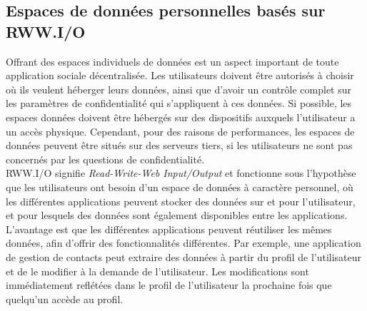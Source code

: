 \documentclass[a4paper]{article}
\begin{document}
\subsection{Espaces de données personnelles basés sur RWW.I/O}
Offrant des espaces individuels de données est un aspect important de toute application sociale décentralisée. Les utilisateurs doivent être autorisés à choisir où ils veulent héberger leurs données, ainsi que d'avoir un contrôle complet sur les paramètres de confidentialité qui s'appliquent à ces données. Si possible, les espaces données doivent être hébergés sur des dispositifs auxquels l'utilisateur a un accès physique. Cependant, pour des raisons de performances, les espaces de données peuvent être situés sur des serveurs tiers, si les utilisateurs ne sont pas concernés par les questions de confidentialité.\\


RWW.I/O signifie \textit{Read-Write-Web Input/Output} et fonctionne sous l'hypothèse que les utilisateurs ont besoin d'un espace de données à caractère personnel, où les différentes applications peuvent stocker des données sur et pour l'utilisateur, et pour lesquels des données sont également disponibles entre les applications. L'avantage est que les différentes applications peuvent réutiliser les mêmes données, afin d'offrir des fonctionnalités différentes. Par exemple, une application de gestion de contacts peut extraire des données à partir du profil de l'utilisateur et de le modifier à la demande de l'utilisateur. Les modifications sont immédiatement reflétées dans le profil de l'utilisateur la prochaine fois que quelqu'un accède au profil.\\
\end{document}
